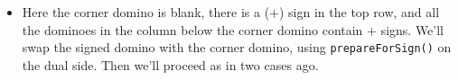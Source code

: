 \documentclass[12pt]{article}
\numberwithin{equation}{section}
\newcommand{\horizontalDominoRSShift}[4]{\filldraw [dominoRSStyle] (#2 - 1 + #4 + \eps, #1 - 1 + \eps) rectangle + (2 - \teps, 1 -\teps) node [dominoText] {$#3$};}
\newcommand{\verticalDominoRSShift}[4]{\filldraw [dominoRSStyle] (#2 - 1 + #4 + \eps,  #1 - 1 + \eps) rectangle + (1 - \teps,2 -\teps) node [dominoText] {$#3$};}
\begin{document}
\begin{itemize}
\begin{itemize}
      \item Here the corner domino is blank, there is a ($+$) sign in the top row, and all the dominoes in the column below the corner domino contain $+$ signs.
      We'll swap the signed domino with the corner domino, using \texttt{prepareForSign()} on the dual side.
      Then we'll proceed as in two cases ago.
      \begin{figure}[H]
        \centering
      \end{figure}

\end{itemize}
\end{itemize}
\end{document}
